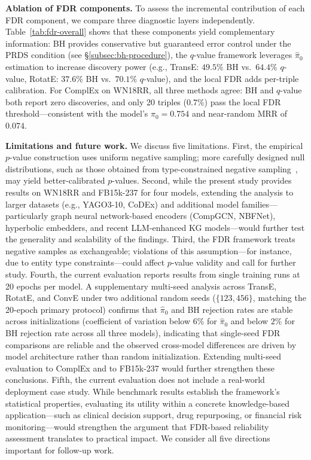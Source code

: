 \textbf{Ablation of FDR components.}
To assess the incremental contribution of each FDR component, we compare three diagnostic layers independently. Table~\ref{tab:fdr-overall} shows that these components yield complementary information: BH provides conservative but guaranteed error control under the PRDS condition (see \S\ref{subsec:bh-procedure}), the $q$-value framework leverages $\hat{\pi}_0$ estimation to increase discovery power (e.g., TransE: $49.5\%$ BH vs.\ $64.4\%$ $q$-value, RotatE: $37.6\%$ BH vs.\ $70.1\%$ $q$-value), and the local FDR adds per-triple calibration. For ComplEx on WN18RR, all three methods agree: BH and $q$-value both report zero discoveries, and only 20 triples ($0.7\%$) pass the local FDR threshold---consistent with the model's $\hat{\pi}_0 = 0.754$ and near-random MRR of $0.074$.

\textbf{Limitations and future work.}
We discuss five limitations.
First, the empirical $p$-value construction uses uniform negative sampling; more carefully designed null distributions, such as those obtained from type-constrained negative sampling~\cite{krompass2015type}, may yield better-calibrated $p$-values.
Second, while the present study provides results on WN18RR and FB15k-237 for four models, extending the analysis to larger datasets (e.g., YAGO3-10, CoDEx) and additional model families---particularly graph neural network-based encoders (CompGCN, NBFNet), hyperbolic embedders, and recent LLM-enhanced KG models---would further test the generality and scalability of the findings.
Third, the FDR framework treats negative samples as exchangeable; violations of this assumption---for instance, due to entity type constraints---could affect $p$-value validity and call for further study.
Fourth, the current evaluation reports results from single training runs at 20 epochs per model. A supplementary multi-seed analysis across TransE, RotatE, and ConvE under two additional random seeds ($\{123, 456\}$, matching the 20-epoch primary protocol) confirms that $\hat{\pi}_0$ and BH rejection rates are stable across initializations (coefficient of variation below $6\%$ for $\hat{\pi}_0$ and below $2\%$ for BH rejection rate across all three models), indicating that single-seed FDR comparisons are reliable and the observed cross-model differences are driven by model architecture rather than random initialization. Extending multi-seed evaluation to ComplEx and to FB15k-237 would further strengthen these conclusions.
Fifth, the current evaluation does not include a real-world deployment case study.
While benchmark results establish the framework's statistical properties, evaluating its utility within a concrete knowledge-based application---such as clinical decision support, drug repurposing, or financial risk monitoring---would strengthen the argument that FDR-based reliability assessment translates to practical impact.
We consider all five directions important for follow-up work.

